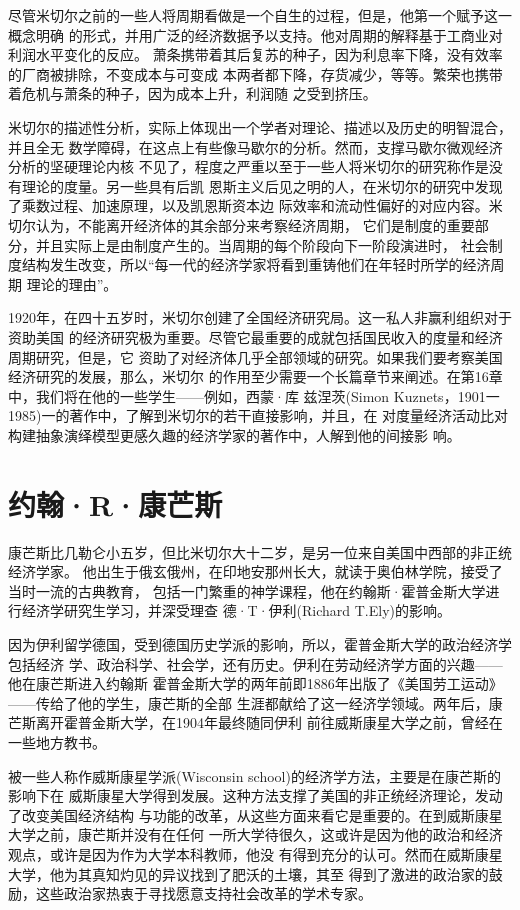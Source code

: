 尽管米切尔之前的一些人将周期看做是一个自生的过程，但是，他第一个赋予这一概念明确
的形式，并用广泛的经济数据予以支持。他对周期的解释基于工商业对利润水平变化的反应。
萧条携带着其后复苏的种子，因为利息率下降，没有效率的厂商被排除，不变成本与可变成
本两者都下降，存货减少，等等。繁荣也携带着危机与萧条的种子，因为成本上升，利润随
之受到挤压。

米切尔的描述性分析，实际上体现出一个学者对理论、描述以及历史的明智混合，并且全无
数学障碍，在这点上有些像马歇尔的分析。然而，支撑马歇尔微观经济分析的坚硬理论内核
不见了，程度之严重以至于一些人将米切尔的研究称作是没有理论的度量。另一些具有后凯
恩斯主义后见之明的人，在米切尔的研究中发现了乘数过程、加速原理，以及凯恩斯资本边
际效率和流动性偏好的对应内容。米切尔认为，不能离开经济体的其余部分来考察经济周期，
它们是制度的重要部分，并且实际上是由制度产生的。当周期的每个阶段向下一阶段演进时，
社会制度结构发生改变，所以“每一代的经济学家将看到重铸他们在年轻时所学的经济周期
理论的理由”。

1920年，在四十五岁时，米切尔创建了全国经济研究局。这一私人非赢利组织对于资助美国
的经济研究极为重要。尽管它最重要的成就包括国民收入的度量和经济周期研究，但是，它
资助了对经济体几乎全部领域的研究。如果我们要考察美国经济研究的发展，那么，米切尔
的作用至少需要一个长篇章节来阐述。在第16章中，我们将在他的一些学生——例如，西蒙·库
兹涅茨(Simon Kuznets，1901一1985)一的著作中，了解到米切尔的若干直接影响，并且，在
对度量经济活动比对构建抽象演绎模型更感久趣的经济学家的著作中，人解到他的间接影
响。

\section{约翰·R·康芒斯}

康芒斯比几勒仑小五岁，但比米切尔大十二岁，是另一位来自美国中西部的非正统经济学家。
他出生于俄玄俄州，在印地安那州长大，就读于奥伯林学院，接受了当时一流的古典教育，
包括一门繁重的神学课程，他在约翰斯·霍普金斯大学进行经济学研究生学习，并深受理查
德·T·伊利(Richard T.Ely)的影响。

因为伊利留学德国，受到德国历史学派的影响，所以，霍普金斯大学的政治经济学包括经济
学、政治科学、社会学，还有历史。伊利在劳动经济学方面的兴趣——他在康芒斯进入约翰斯
霍普金斯大学的两年前即1886年出版了《美国劳工运动》——传给了他的学生，康芒斯的全部
生涯都献给了这一经济学领域。两年后，康芒斯离开霍普金斯大学，在1904年最终随同伊利
前往威斯康星大学之前，曾经在一些地方教书。

被一些人称作威斯康星学派(Wisconsin school)的经济学方法，主要是在康芒斯的影响下在
威斯康星大学得到发展。这种方法支撑了美国的非正统经济理论，发动了改变美国经济结构
与功能的改革，从这些方面来看它是重要的。在到威斯康星大学之前，康芒斯并没有在任何
一所大学待很久，这或许是因为他的政治和经济观点，或许是因为作为大学本科教师，他没
有得到充分的认可。然而在威斯康星大学，他为其真知灼见的异议找到了肥沃的土壤，其至
得到了激进的政治家的鼓励，这些政治家热衷于寻找愿意支持社会改革的学术专家。

